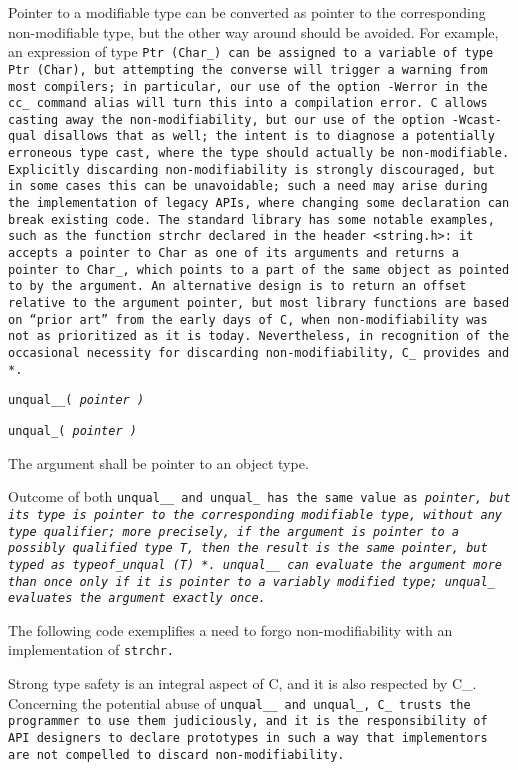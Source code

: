 Pointer to a modifiable type can be converted as pointer to the corresponding
non-modifiable type, but the other way around should be avoided.
For example, an expression of type \tt{Ptr (Char_)} can be assigned to a
variable of type \tt{Ptr (Char)}, but attempting the converse will trigger a
warning from most compilers; in particular, our use of the option \tt{-Werror}
in the \tt{cc_} command alias will turn this into a compilation error.
C allows casting away the non-modifiability, but our use of the option
\tt{-Wcast-qual} disallows that as well; the intent is to diagnose a potentially
erroneous type cast, where the type should actually be non-modifiable.
Explicitly discarding non-modifiability is strongly discouraged, but in some
cases this can be unavoidable; such a need may arise during the implementation
of legacy APIs, where changing some declaration can break existing code.
The standard library has some notable examples, such as the function \tt{strchr}
declared in the header \tt{<string.h>}: it accepts a pointer to
\tt{Char} as one of its arguments and returns a pointer to \tt{Char_},
which points to a part of the same object as pointed to by the argument.
An alternative design is to return an offset relative to the argument pointer,
but most library functions are based on ``prior art'' from the early days of C,
when non-modifiability was not as prioritized as it is today.
Nevertheless, in recognition of the occasional necessity for discarding
non-modifiability, C\_ provides  and *.


\tt{unqual_}\_\s\tt{(} \it{pointer} \tt{)}

\tt{unqual_}\s\s\tt{(} \it{pointer} \tt{)}


The argument shall be pointer to an object type.


Outcome of both \tt{unqual__} and \tt{unqual_} has the same value as
\it{pointer}, but its type is pointer to the corresponding modifiable type,
without any type qualifier; more precisely, if the argument is pointer
to a possibly qualified type \tt{T}, then the result is the same pointer,
but typed as \tt{typeof_unqual (T) *}.
\tt{unqual__} can evaluate the argument more than once only if it is pointer
to a variably modified type; \tt{unqual_} evaluates the argument exactly once.

\example The following code exemplifies a need to forgo
non-modifiability with an implementation of \tt{strchr}.


\note Strong type safety is an integral aspect of C,
and it is also respected by C\_.
Concerning the potential abuse of \tt{unqual__} and \tt{unqual_},
C\_ trusts the programmer to use them judiciously,
and it is the responsibility of API designers to declare prototypes in
such a way that implementors are not compelled to discard non-modifiability.
